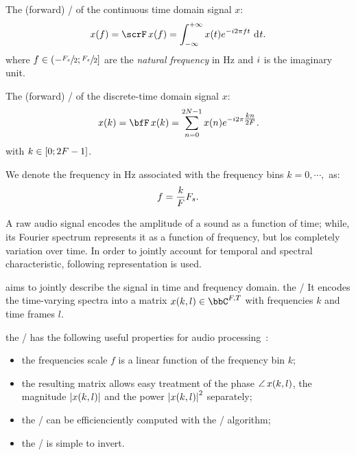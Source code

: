 The (forward) \FTdef/ of the continuous time domain signal $x$:
\begin{equation}
    x(f) = \fourierTrans{x}(f) =
        \int_{-\infty}^{+\infty}
        x(t)
        \cste^{-\csti 2 \pi f t}
        \,\kdiff{t}.
\end{equation}
where $f \in \kintervoc{-\sfrac{\Fs}{2}}{\sfrac{\Fs}{2}}$ are the \textit{natural frequency} in $\si{\Hz}$ and ${i}$ is the imaginary unit.

The (forward) \DFTdef/ of the discrete-time domain signal $x$:
\begin{equation}\label{eq:processing:dft}
    x(k) = \discreteFT{x}(k) =
    \sum_{n = 0}^{2 N - 1}
    x(n)
    \cste^{-\csti2\pi \tfrac{k n}{2 F}}.
\end{equation}
with $k \in \kintervcc{0}{2 F - 1}$.

We denote the frequency in $\si{\Hz}$ associated with the frequency bins $k = 0, \cdots, $ as:
\begin{equation}
    f = \frac{k}{F}F_s.
\end{equation}

A raw audio signal encodes the amplitude of a sound as a function of time; while, its Fourier spectrum
represents it as a function of frequency, but los completely variation over time.
In order to jointly account for temporal and spectral characteristic, following representation is used.

 aims to jointly describe the signal in time and frequency domain.
the \STFTdef/ It encodes the time-varying spectra into a matrix $x(k,l) \in \bbC^{F,T}$ with frequencies $k$ and time frames $l$.

the \STFT/ has the following useful properties for audio processing~\cite{vincent2018audio}:
\begin{itemize}
    \item the frequencies scale $f$ is a linear function of the frequency bin $k$;
    \item the resulting matrix allows easy treatment of
          the phase $\operatorname*{\angle}{x(k,l)}$, the magnitude $\magnitudeOf{x(k,l)}$ and the power $\powerOf{x(k,l)}$ separately;
    \item the \DFT/ can be efficienciently computed with the \FFT/ algorithm;
    \item the \STFT/ is simple to invert.
\end{itemize}

